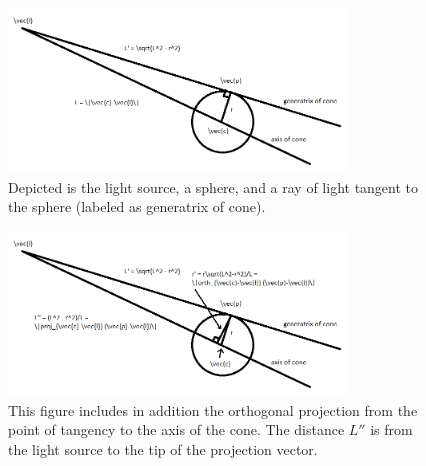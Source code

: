 \documentclass[10pt]{article}
\begin{document}
\begin{appendices}
\begin{figure}[ht]
    \centering
    \includegraphics[width=0.8\textwidth]{sphere_shadow_figure_1.png}
    \caption{Depicted is the light source, a sphere, and a ray of light tangent to the sphere (labeled as generatrix of cone).}
    \label{fig:shadow_1}
\end{figure}

\begin{figure}[ht]
    \centering
    \includegraphics[width=0.8\textwidth]{sphere_shadow_figure_2.png}
    \caption{This figure includes in addition the orthogonal projection from the point of tangency to the axis of the cone. The distance $L''$ is from the light source to the tip of the projection vector.}
    \label{fig:shadow_2}
\end{figure}



\end{appendices}
\end{document}
